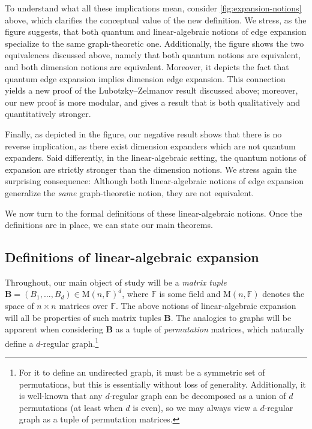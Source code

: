 \documentclass{toc}
\theoremstyle{plain}
\numberwithin{equation}{section}
\theoremstyle{definition}
\newcommand{\F}{\mathbb{F}}
\newcommand{\M}{\mathrm{M}}
\newcommand{\tuple}[1]{\mathbf{#1}}
\newcommand{\vB}{\tuple{B}}
\begin{document}
To understand what all these implications mean, consider \cref{fig:expansion-notions} above, which clarifies the conceptual value of the new definition. We stress, as the figure suggests, that both quantum and linear-algebraic notions of edge expansion specialize to the same graph-theoretic one. Additionally, the figure shows the two equivalences discussed above, namely that both 
%
quantum
%
notions are equivalent, and both 
%
dimension
%
notions are equivalent. Moreover, it depicts the fact that quantum edge expansion implies dimension edge expansion. This connection yields a new proof of the Lubotzky--Zelmanov result discussed above; moreover, our new proof is more modular, and gives a result that is both qualitatively and quantitatively stronger.

Finally, as depicted in the figure, our negative result shows that there is no reverse implication, as there exist dimension expanders which are not quantum expanders. Said differently, in the linear-algebraic setting, the 
%
quantum
%
notions of expansion are strictly stronger than the 
%
dimension
%
notions. We stress again the surprising consequence: Although both linear-algebraic notions of edge expansion generalize the \emph{same} graph-theoretic notion, they are not equivalent.

We now turn to the formal definitions of these linear-algebraic notions. Once the definitions are in place, we can state our main theorems.

\subsection{Definitions of linear-algebraic expansion}
Throughout, our main object of study will be a \emph{matrix tuple} $\vB=(B_1,\dots,B_d) \in \M(n,\F)^d$, where $\F$ is some field and $\M(n,\F)$ denotes the space of $n\times n$ matrices over $\F$. The above notions of linear-algebraic expansion will all be properties of such matrix tuples $\vB$. The analogies to graphs will be apparent when considering $\vB$ as a tuple of \emph{permutation} matrices, which naturally define a $d$-regular graph.\footnote{For it to define an undirected graph, it must be a symmetric set of permutations, but this is essentially without loss of generality. Additionally, it is well-known \cite{Gross77} that any $d$-regular graph can be decomposed as a union of $d$ permutations (at least when $d$ is even), so we may always view a $d$-regular graph as a tuple of permutation matrices.}
\end{document}
